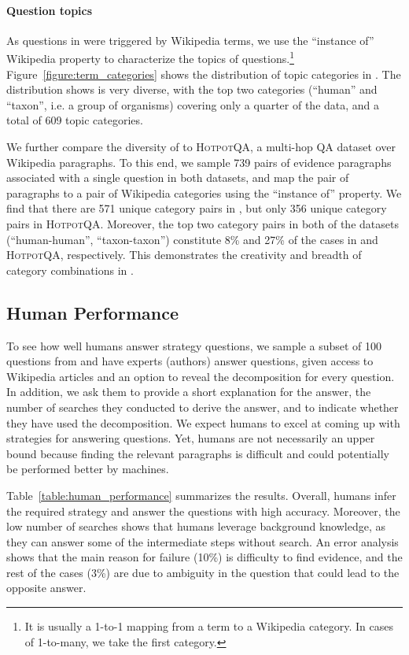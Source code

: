 {\paragraph{Question topics}
As questions in \strategyqa{} were triggered by Wikipedia terms, we use the ``instance of'' Wikipedia property to characterize the topics of questions.\footnote{It is usually a 1-to-1 mapping from a term to a Wikipedia category. In cases of 1-to-many, we take the first category. 
} 
Figure~\ref{figure:term_categories} shows the distribution of topic categories in \strategyqa{}. The distribution shows \strategyqa{} is very diverse, with the top two categories (``human'' and ``taxon'', i.e. a group of organisms) covering only a quarter of the data, and a total of 609 topic categories.

We further compare the diversity of \strategyqa{} to \textsc{HotpotQA}, a multi-hop QA dataset over Wikipedia paragraphs. To this end, we sample 739 pairs of evidence paragraphs associated with a single question in both datasets, and map the pair of paragraphs to a pair of Wikipedia categories using the ``instance of'' property.
We find that there are 571 unique category pairs in \strategyqa{}, but only 356 unique category pairs in \textsc{HotpotQA}.
Moreover, the top two category pairs in both of the datasets (``human-human'', ``taxon-taxon'') constitute 8\% and 27\% of the cases in \strategyqa{} and \textsc{HotpotQA}, respectively. This demonstrates the creativity and breadth of category combinations in \strategyqa{}.

\subsection{Human Performance}
\label{subsec:human_performance}

To see how well humans answer strategy questions, 
we sample a subset of 100 questions from \strategyqa{} and have experts (authors) answer questions, given access to Wikipedia articles and an option to reveal the decomposition for every question. In addition, we ask them to provide a short explanation for the answer, the number of searches they conducted to derive the answer, and to indicate whether they have used the decomposition. 
We expect humans to excel at coming up with strategies for answering questions. Yet, humans are not necessarily an upper bound because finding the relevant paragraphs is difficult and could potentially be performed better by machines.

Table~\ref{table:human_performance} summarizes the results. Overall, humans infer the required strategy and answer the questions with high accuracy. 
Moreover, the low number of searches shows that humans leverage background knowledge, as they can answer some of the intermediate steps without search.  
An error analysis shows that the main reason for failure (10\%) is difficulty to find evidence, and the rest of the cases (3\%) are due to ambiguity in the question that could lead to the opposite answer.

}
